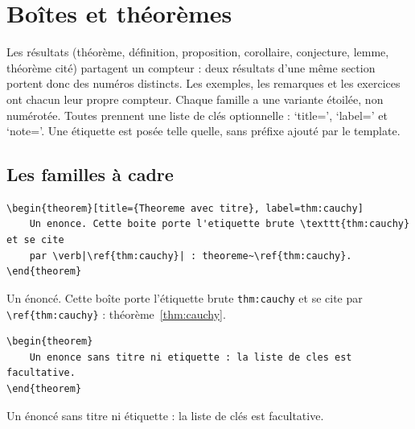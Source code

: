 %

\lstset{language=[LaTeX]TeX}

\chapter{Boîtes et théorèmes}%
\label{chap:boxes}
\minitoc%

\begin{chapterintro}
    Les résultats (théorème, définition, proposition, corollaire, conjecture,
    lemme, théorème cité) partagent un compteur : deux résultats d'une même
    section portent donc des numéros distincts. Les exemples, les remarques et
    les exercices ont chacun leur propre compteur. Chaque famille a une variante
    étoilée, non numérotée. Toutes prennent une liste de clés optionnelle :
    `title=', `label=' et `note='. Une étiquette est posée telle quelle, sans
    préfixe ajouté par le template.
\end{chapterintro}

\section{Les familles à cadre}%
\label{sec:framed}

\begin{lstlisting}
\begin{theorem}[title={Theoreme avec titre}, label=thm:cauchy]
    Un enonce. Cette boite porte l'etiquette brute \texttt{thm:cauchy} et se cite
    par \verb|\ref{thm:cauchy}| : theoreme~\ref{thm:cauchy}.
\end{theorem}
\end{lstlisting}
\begin{theorem}[title={Théorème avec titre}, label=thm:cauchy]
    Un énoncé. Cette boîte porte l'étiquette brute \texttt{thm:cauchy} et se cite
    par \verb|\ref{thm:cauchy}| : théorème~\ref{thm:cauchy}.
\end{theorem}

\begin{lstlisting}
\begin{theorem}
    Un enonce sans titre ni etiquette : la liste de cles est facultative.
\end{theorem}
\end{lstlisting}
\begin{theorem}
    Un énoncé sans titre ni étiquette : la liste de clés est facultative.
\end{theorem}

